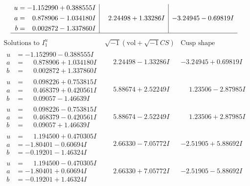 \documentclass[1p]{elsarticle_modified}
\theoremstyle{definition}
\newcommand{\I}{\sqrt{-1}}
\begin{document}
$$\begin{array}{c|c|c}
\begin{aligned}
u &= -1.152990 + 0.388555 I \\
a &= \phantom{-}0.878906 - 1.034180 I \\
b &= \phantom{-}0.002872 - 1.337860 I\end{aligned}
 & \phantom{-}2.24498 + 1.33286 I & -3.24945 - 0.69819 I\\
 \hline 
 \end{array}$$\newpage$$\begin{array}{c|c|c}  
\text{Solutions to }I^u_{1}& \I (\text{vol} + \sqrt{-1}CS) & \text{Cusp shape}\\
 \hline 
\begin{aligned}
u &= -1.152990 - 0.388555 I \\
a &= \phantom{-}0.878906 + 1.034180 I \\
b &= \phantom{-}0.002872 + 1.337860 I\end{aligned}
 & \phantom{-}2.24498 - 1.33286 I & -3.24945 + 0.69819 I \\ \hline\begin{aligned}
u &= \phantom{-}0.098226 + 0.753815 I \\
a &= \phantom{-}0.468379 + 0.420561 I \\
b &= \phantom{-}0.09057 - 1.46639 I\end{aligned}
 & \phantom{-}5.88674 + 2.52249 I & \phantom{-}1.23506 - 2.87985 I \\ \hline\begin{aligned}
u &= \phantom{-}0.098226 - 0.753815 I \\
a &= \phantom{-}0.468379 - 0.420561 I \\
b &= \phantom{-}0.09057 + 1.46639 I\end{aligned}
 & \phantom{-}5.88674 - 2.52249 I & \phantom{-}1.23506 + 2.87985 I \\ \hline\begin{aligned}
u &= \phantom{-}1.194500 + 0.470305 I \\
a &= -1.80401 - 0.60694 I \\
b &= -0.19201 - 1.46324 I\end{aligned}
 & \phantom{-}2.66330 - 7.05772 I & -2.51905 + 5.88692 I \\ \hline\begin{aligned}
u &= \phantom{-}1.194500 - 0.470305 I \\
a &= -1.80401 + 0.60694 I \\
b &= -0.19201 + 1.46324 I\end{aligned}
 & \phantom{-}2.66330 + 7.05772 I & -2.51905 - 5.88692 I \\ \hline\begin{aligned}

\end{aligned}
\end{array}$$
\end{document}
